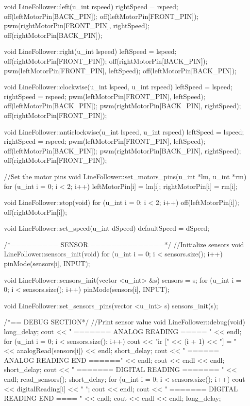 \documentclass[14pt,a4paper]{extarticle}
\begin{document}
\begin{spverbatim}
void LineFollower::left(u_int rspeed)
{
  rightSpeed = rspeed;
  off(leftMotorPin[BACK_PIN]);
  off(leftMotorPin[FRONT_PIN]);
  pwm(rightMotorPin[FRONT_PIN], rightSpeed);
  off(rightMotorPin[BACK_PIN]);
}

void LineFollower::right(u_int lspeed)
{
  leftSpeed = lspeed;
  off(rightMotorPin[FRONT_PIN]);
  off(rightMotorPin[BACK_PIN]);
  pwm(leftMotorPin[FRONT_PIN], leftSpeed);
  off(leftMotorPin[BACK_PIN]);
}

void LineFollower::clockwise(u_int lspeed, u_int rspeed)
{
  leftSpeed = lspeed;
  rightSpeed = rspeed;
  pwm(leftMotorPin[FRONT_PIN], leftSpeed);
  off(leftMotorPin[BACK_PIN]);
  pwm(rightMotorPin[BACK_PIN], rightSpeed);
  off(rightMotorPin[FRONT_PIN]);
}

void LineFollower::anticlockwise(u_int lspeed, u_int rspeed)
{
  leftSpeed = lspeed;
  rightSpeed = rspeed;
  pwm(leftMotorPin[FRONT_PIN], leftSpeed);
  off(leftMotorPin[BACK_PIN]);
  pwm(rightMotorPin[BACK_PIN], rightSpeed);
  off(rightMotorPin[FRONT_PIN]);
}

//Set the motor pins
void LineFollower::set_motors_pins(u_int *lm, u_int *rm)
{
  for (u_int i = 0; i < 2; i++){
    leftMotorPin[i] = lm[i];
    rightMotorPin[i] = rm[i];
  }
}

void LineFollower::stop(void)
{
  for (u_int i = 0; i < 2; i++){
    off(leftMotorPin[i]);
    off(rightMotorPin[i]);
  }
}

void LineFollower::set_speed(u_int dSpeed)
{
  defaultSpeed = dSpeed;
}

/*========= SENSOR ==============*/
//Initialize sensors
void LineFollower::sensors_init(void)
{
  for (u_int i = 0; i < sensors.size(); i++)
    pinMode(sensors[i], INPUT);
}

void LineFollower::sensors_init(vector <u_int> &s)
{
  sensors = s;
  for (u_int i = 0; i < sensors.size(); i++) pinMode(sensors[i], INPUT);
}

void LineFollower::set_sensors_pins(vector <u_int> s)
{
  sensors_init(s);
}

/*== DEBUG SECTION*/
//Print sensor value
void LineFollower::debug(void)
{
  long_delay;
  cout << " ======= ANALOG READING ===== " << endl;
  for (u_int i = 0; i < sensors.size(); i++)
  {
    cout << "ir [" << (i + 1) << "] = " << analogRead(sensors[i]) << endl;
    short_delay;
  }
  cout << " ====== ANALOG READING END ======" << endl;
  cout << endl << endl;
  short_delay;
  cout << " ======= DIGITAL READING ======= " << endl;
  read_sensors();
  short_delay;
  for (u_int i = 0; i < sensors.size(); i++)
    cout << digitalReading[i] << " ";
  cout << endl;
  cout << " ======= DIGITAL READING END ==== " << endl;
  cout << endl << endl;
  long_delay;
}


\end{spverbatim}
\end{document}
